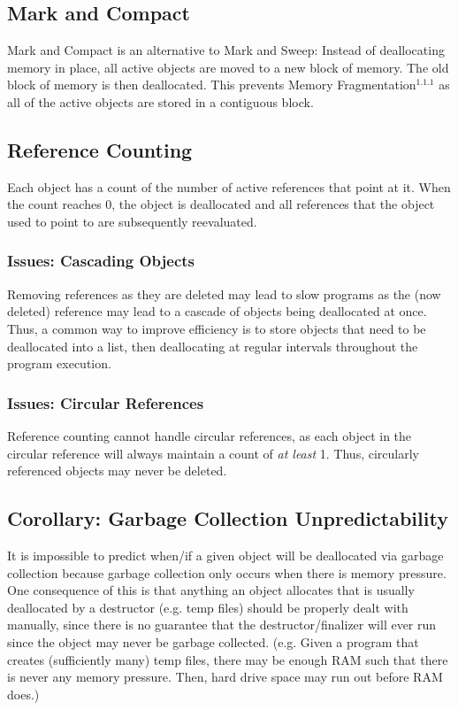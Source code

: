 \documentclass{article}
\begin{document}
\subsection{Mark and Compact}
Mark and Compact is an alternative to Mark and Sweep: Instead of
deallocating memory in place, all active objects are moved to a new
block of memory. The old block of memory is then deallocated. This
prevents Memory Fragmentation$^{1.1.1}$ as all of the active objects
are stored in a contiguous block.

\subsection{Reference Counting}
Each object has a count of the number of active references that point
at it. When the count reaches 0, the object is deallocated and all
references that the object used to point to are subsequently
reevaluated.

\subsubsection{Issues: Cascading Objects}
Removing references as they are deleted may lead to slow programs as
the (now deleted) reference may lead to a cascade of objects being
deallocated at once. Thus, a common way to improve efficiency is to
store objects that need to be deallocated into a list, then
deallocating at regular intervals throughout the program execution.

\subsubsection{Issues: Circular References}
Reference counting cannot handle circular references, as each object
in the circular reference will always maintain a count of \textit{at
  least} 1. Thus, circularly referenced objects may never be deleted.

\subsection{Corollary: Garbage Collection Unpredictability}
It is impossible to predict when/if a given object will be deallocated
via garbage collection because garbage collection only occurs when
there is memory pressure. One consequence of this is that anything an
object allocates that is usually deallocated by a destructor
(e.g. temp files) should be properly dealt with manually, since there
is no guarantee that the destructor/finalizer will ever run since the
object may never be garbage collected. (e.g. Given a program that
creates (sufficiently many) temp files, there may be enough RAM such
that there is never any memory pressure. Then, hard drive space may
run out before RAM does.) 
\end{document}
